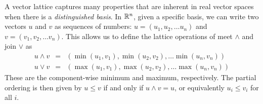 \begin{example}
  \label{example:finite}
  A vector lattice captures many properties that are inherent in real
  vector spaces when there is a \emph{distinguished basis}. In $\mathbb{R}^n$,
  given a specific basis, we can write two vectors $u$ and $v$ as
  sequences of numbers: $u = (u_1,u_2,\ldots u_n)$ and $v =
  (v_1,v_2,\ldots v_n)$. This allows us to define the lattice
  operations of meet $\land$ and join $\lor$ as
\begin{eqnarray*}
u\land v &=& (\min(u_1,v_1),\min(u_2,v_2),\ldots \min(u_n,v_n))\\
u\lor v &=& (\max(u_1,v_1),\max(u_2,v_2),\ldots \max(u_n,v_n))
\end{eqnarray*}
These are the component-wise minimum and maximum, respectively. The partial
ordering is then given by $u \le v$ if and only if $u \land v = u$, or
equivalently $u_i \le v_i$ for all $i$.
\end{example}
